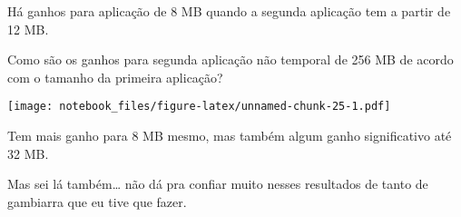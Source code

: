 \documentclass[
]{article}
\newenvironment{Shaded}{\begin{snugshade}}{\end{snugshade}}
\newcommand{\CommentTok}[1]{\textcolor[rgb]{0.56,0.35,0.01}{\textit{#1}}}
\newcommand{\DataTypeTok}[1]{\textcolor[rgb]{0.13,0.29,0.53}{#1}}
\newcommand{\DecValTok}[1]{\textcolor[rgb]{0.00,0.00,0.81}{#1}}
\newcommand{\KeywordTok}[1]{\textcolor[rgb]{0.13,0.29,0.53}{\textbf{#1}}}
\newcommand{\NormalTok}[1]{#1}
\newcommand{\OperatorTok}[1]{\textcolor[rgb]{0.81,0.36,0.00}{\textbf{#1}}}
\newcommand{\StringTok}[1]{\textcolor[rgb]{0.31,0.60,0.02}{#1}}
\begin{document}
Há ganhos para aplicação de 8 MB quando a segunda aplicação tem a partir
de 12 MB.

Como são os ganhos para segunda aplicação não temporal de 256 MB de
acordo com o tamanho da primeira aplicação?

\begin{Shaded}
\end{Shaded}

\texttt{[image: notebook\_files/figure-latex/unnamed-chunk-25-1.pdf]}

Tem mais ganho para 8 MB mesmo, mas também algum ganho significativo até
32 MB.

Mas sei lá também\ldots{} não dá pra confiar muito nesses resultados de
tanto de gambiarra que eu tive que fazer.
\end{document}
